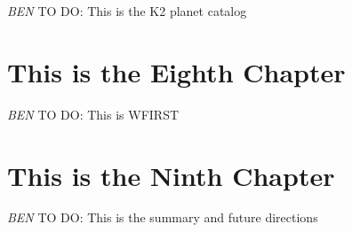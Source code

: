\documentclass[12pt]{caltech_thesis}
\newcommand{\todo}[3]{{\color{#2} \emph{#1} TO DO: #3}}
\newcommand{\btmtodo}[1]{\todo{BEN}{red}{#1}}
\begin{document}
\btmtodo{This is the K2 planet catalog}

\chapter{This is the Eighth Chapter}

\btmtodo{This is WFIRST}

\chapter{This is the Ninth Chapter}

\btmtodo{This is the summary and future directions}

\printbibliography[heading=bibintoc]
%





\end{document}
